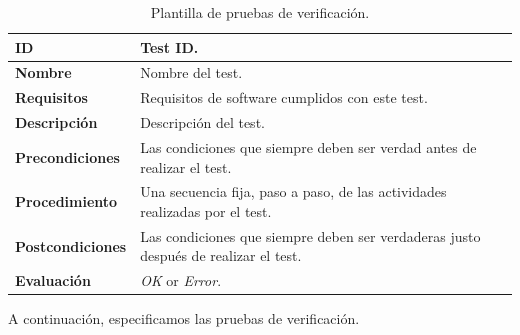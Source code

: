 \begin{center}
\begin{table}[htb]
\centering
\begin{tabular}{@{}p{2.5cm} p{9cm}@{}} 
\toprule
\textbf{ID} 					& Test ID. \\
\midrule
\textbf{Nombre} 				& Nombre del test. \\
\midrule
\textbf{Requisitos} 		& Requisitos de software cumplidos con este test. \\
\midrule
\textbf{Descripción} 		& Descripción del test. \\
\midrule
\textbf{Precondiciones}		& Las condiciones que siempre deben ser verdad antes de realizar el test. \\
\midrule
\textbf{Procedimiento}			& Una secuencia fija, paso a paso, de las actividades realizadas por el test. \\
\midrule
\textbf{Postcondiciones} 		& Las condiciones que siempre deben ser verdaderas justo después de realizar el test. \\
\midrule
\textbf{Evaluación} 			& \textit{OK} or \textit{Error}. \\
\bottomrule
\end{tabular}
\caption{Plantilla de pruebas de verificación.}
\label{tab:verification_tests}
\end{table}
\end{center}

A continuación, especificamos las pruebas de verificación.

